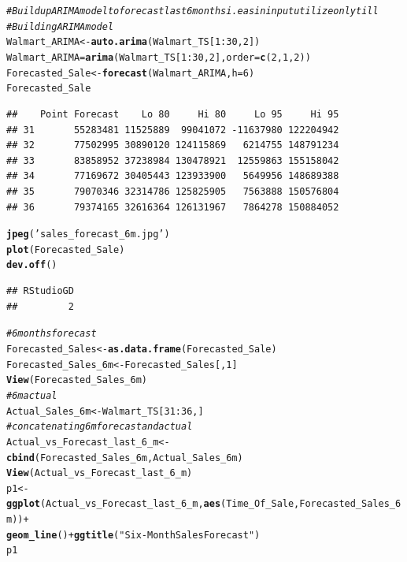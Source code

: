 \documentclass{article}\usepackage[]{graphicx}\usepackage[]{color}
\makeatletter
\newcommand{\hlnum}[1]{\textcolor[rgb]{0.686,0.059,0.569}{#1}}%
\newcommand{\hlstr}[1]{\textcolor[rgb]{0.192,0.494,0.8}{#1}}%
\newcommand{\hlcom}[1]{\textcolor[rgb]{0.678,0.584,0.686}{\textit{#1}}}%
\newcommand{\hlopt}[1]{\textcolor[rgb]{0,0,0}{#1}}%
\newcommand{\hlstd}[1]{\textcolor[rgb]{0.345,0.345,0.345}{#1}}%
\newcommand{\hlkwb}[1]{\textcolor[rgb]{0.69,0.353,0.396}{#1}}%
\newcommand{\hlkwc}[1]{\textcolor[rgb]{0.333,0.667,0.333}{#1}}%
\newcommand{\hlkwd}[1]{\textcolor[rgb]{0.737,0.353,0.396}{\textbf{#1}}}%
\newenvironment{kframe}{%
 \def\at@end@of@kframe{}%
 \ifinner\ifhmode%
  \def\at@end@of@kframe{\end{minipage}}%
  \begin{minipage}{\columnwidth}%
 \fi\fi%
 \def\FrameCommand##1{\hskip\@totalleftmargin \hskip-\fboxsep
 \colorbox{shadecolor}{##1}\hskip-\fboxsep
     \hskip-\linewidth \hskip-\@totalleftmargin \hskip\columnwidth}%
 \MakeFramed {\advance\hsize-\width
   \@totalleftmargin\z@ \linewidth\hsize
   \@setminipage}}%
 {\par\unskip\endMakeFramed%
 \at@end@of@kframe}
\newenvironment{knitrout}{}{} %
\makeatother
\begin{document}
\begin{knitrout}
\begin{kframe}
\begin{alltt}
\hlcom{# Build up ARIMA model to forecast last 6 months i.e as in input utilize only till }
\hlcom{# Building ARIMA model}
\hlstd{Walmart_ARIMA} \hlkwb{<-} \hlkwd{auto.arima}\hlstd{(Walmart_TS[}\hlnum{1}\hlopt{:}\hlnum{30}\hlstd{,}\hlnum{2}\hlstd{])}
\hlstd{Walmart_ARIMA} \hlkwb{=} \hlkwd{arima}\hlstd{(Walmart_TS[}\hlnum{1}\hlopt{:}\hlnum{30}\hlstd{,}\hlnum{2}\hlstd{],}\hlkwc{order}\hlstd{=}\hlkwd{c}\hlstd{(}\hlnum{2}\hlstd{,}\hlnum{1}\hlstd{,}\hlnum{2}\hlstd{))}
\hlstd{Forecasted_Sale} \hlkwb{<-} \hlkwd{forecast}\hlstd{(Walmart_ARIMA,}\hlkwc{h}\hlstd{=}\hlnum{6}\hlstd{)}
\hlstd{Forecasted_Sale}
\end{alltt}
\begin{verbatim}
##    Point Forecast    Lo 80     Hi 80     Lo 95     Hi 95
## 31       55283481 11525889  99041072 -11637980 122204942
## 32       77502995 30890120 124115869   6214755 148791234
## 33       83858952 37238984 130478921  12559863 155158042
## 34       77169672 30405443 123933900   5649956 148689388
## 35       79070346 32314786 125825905   7563888 150576804
## 36       79374165 32616364 126131967   7864278 150884052
\end{verbatim}
\begin{alltt}
\hlkwd{jpeg}\hlstd{(}\hlstr{'sales_forecast_6m.jpg'}\hlstd{)}
\hlkwd{plot}\hlstd{(Forecasted_Sale)}
\hlkwd{dev.off}\hlstd{()}
\end{alltt}
\begin{verbatim}
## RStudioGD 
##         2
\end{verbatim}
\begin{alltt}
\hlcom{# 6 months forecast}
\hlstd{Forecasted_Sales} \hlkwb{<-} \hlkwd{as.data.frame}\hlstd{(Forecasted_Sale)}
\hlstd{Forecasted_Sales_6m} \hlkwb{<-} \hlstd{Forecasted_Sales[,}\hlnum{1}\hlstd{]}
\hlkwd{View}\hlstd{(Forecasted_Sales_6m)}
\hlcom{# 6 m actual}
\hlstd{Actual_Sales_6m} \hlkwb{<-} \hlstd{Walmart_TS[}\hlnum{31}\hlopt{:}\hlnum{36}\hlstd{,]}
\hlcom{# concatenating 6 m forecast and actual}
\hlstd{Actual_vs_Forecast_last_6_m} \hlkwb{<-} \hlkwd{cbind}\hlstd{(Forecasted_Sales_6m,Actual_Sales_6m)}
\hlkwd{View}\hlstd{(Actual_vs_Forecast_last_6_m)}
\hlstd{p1}\hlkwb{<-}\hlkwd{ggplot}\hlstd{(Actual_vs_Forecast_last_6_m,} \hlkwd{aes}\hlstd{(Time_Of_Sale, Forecasted_Sales_6m))}\hlopt{+}
  \hlkwd{geom_line}\hlstd{()}\hlopt{+}\hlkwd{ggtitle}\hlstd{(}\hlstr{"Six-Month Sales Forecast"}\hlstd{)}
\hlstd{p1}
\end{alltt}
\end{kframe}


\end{knitrout}
\end{document}
